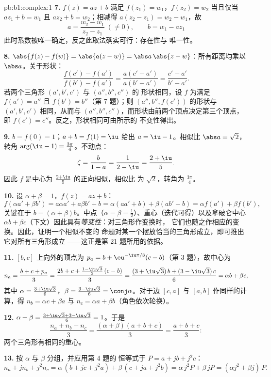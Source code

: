 \begin{solution}{pb:b1:complex:1}
\textbf{7.} $f(z) = az + b$ 满足 $f(z_1) = w_1$，$f(z_2) =
w_2$ 当且仅当 $a z_1 + b = w_1$ 且 $a z_2 + b = w_2$；相减得
$a(z_2 - z_1) = w_2 - w_1$，故
\[
a = \frac{w_2 - w_1}{z_2 - z_1} \;(\neq 0), \qquad
b = w_1 - a z_1
\]
此时系数被唯一确定，反之此取法确实可行：存在性与
唯一性。

\textbf{8.} $\abs{f(z) - f(w)} = \abs{a(z - w)} = \abs a\,\abs{z -
w}$：所有距离均乘以 $\abs a$。关于形状：
\[
\frac{f(c') - f(a')}{f(b') - f(a')} = \frac{a(c' -
a')}{a(b' - a')} = \frac{c' - a'}{b' - a'} .
\]
若两个三角形 $(a', b', c')$ 与 $(a'', b'', c'')$ 的
形状相同，设 $f$ 为满足 $f(a') = a''$
且 $f(b') = b''$（第 7 题）；则 $(a'', b'',
f(c'))$ 的形状与 $(a', b', c')$ 相同，从而与 $(a'', b'',
c'')$，而形状由前两个顶点决定第三个顶点，
即 $f(c') = c''$。反之，形状相同可由所示的
不变性得出。

\textbf{9.} $b = f(0) = 1$；$a + b = f(1) = \iu$ 给出 $a = \iu -
1$。相似比 $\abs a = \sqrt2$，转角 $\arg(\iu - 1) =
\frac{3\pi}4$。不动点：
\[
\zeta = \frac{b}{1 - a} = \frac1{2 - \iu} = \frac{2 + \iu}5 .
\]
因此 $f$ 是中心为 $\frac{2+\iu}5$ 的正向相似，相似比
为 $\sqrt2$，转角为 $\frac{3\pi}4$。

\textbf{10.} 设 $\alpha + \beta = 1$，$f(z) = az + b$：
\[
f(\alpha a' + \beta b') = a\alpha a' + a\beta b' + b
= \alpha(a a' + b) + \beta(a b' + b)
= \alpha f(a') + \beta f(b') ,
\]
关键在于 $b = (\alpha + \beta)b$。中点（$\alpha = \beta =
\frac12$）、重心（迭代可得）以及拿破仑中心 $\alpha b
+ \beta c$（下文）因此具有\emph{等变性}：对三角形作变换时，
它们也随之作相应的变换。因此，证明一个相似不变的
命题对某一个摆放恰当的三角形成立，即可推出它对所有三角形成立
——这正是第 21 题所用的依据。

\textbf{11.} $[b, c]$ 上向外的顶点为 $p_a = b +
\eu^{-\iu\pi/3}(c - b)$（第 3 题），故中心为
\[
n_a = \frac{b + c + p_a}3
= \frac{2b + c + \frac{1 - \iu\sqrt3}2\,(c - b)}3
= \frac{(3 + \iu\sqrt3)\,b + (3 - \iu\sqrt3)\,c}6
= \alpha b + \beta c ,
\]
其中 $\alpha = \frac{3 + \iu\sqrt3}6$，$\beta = \frac{3 -
\iu\sqrt3}6 = \conj\alpha$。对于边
$[c, a]$ 与 $[a, b]$ 作同样的计算，得 $n_b = \alpha c + \beta a$ 与 $n_c =
\alpha a + \beta b$（角色依次轮换）。

\textbf{12.} $\alpha + \beta = \frac{3 + \iu\sqrt3 + 3 -
\iu\sqrt3}6 = 1$。于是
\[
\frac{n_a + n_b + n_c}3
= \frac{(\alpha + \beta)(a + b + c)}3 = \frac{a + b + c}3 :
\]
两个三角形有相同的重心。

\textbf{13.} 按 $\alpha$ 与 $\beta$ 分组，并应用第 4 题的
恒等式于 $P = a + jb + j^2c$：
\[
n_a + j n_b + j^2 n_c
= \alpha\,(b + jc + j^2 a) + \beta\,(c + ja + j^2 b)
= \alpha\,j^2 P + \beta\,j P
= (\alpha j^2 + \beta j)\,P .
\]


\end{solution}
